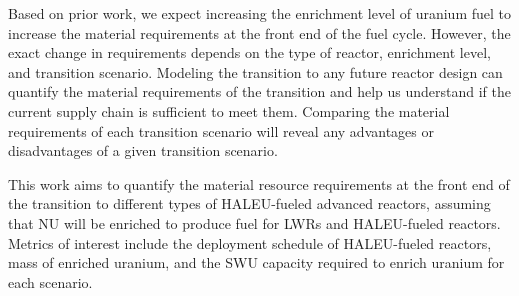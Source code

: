Based on prior work, we expect increasing the enrichment level of uranium fuel 
to increase the material requirements at the front end of 
the fuel cycle. However, the exact change in requirements depends 
on the type of reactor, enrichment level, and transition scenario.
Modeling the transition to any future
reactor design can quantify the material requirements of the transition
and help us understand if the current supply chain is sufficient to meet them. 
Comparing the material requirements of each transition scenario will 
reveal any advantages or disadvantages of a given transition scenario. 

This work aims to quantify the material resource requirements at the front 
end of the 
transition to different types of \gls{HALEU}-fueled advanced reactors, 
assuming that \gls{NU} will be enriched to produce fuel for \glspl{LWR} and 
\gls{HALEU}-fueled reactors. 
Metrics of interest include the deployment schedule of \gls{HALEU}-fueled 
reactors, mass of enriched uranium, and the \gls{SWU} capacity required to 
enrich uranium for each scenario. 